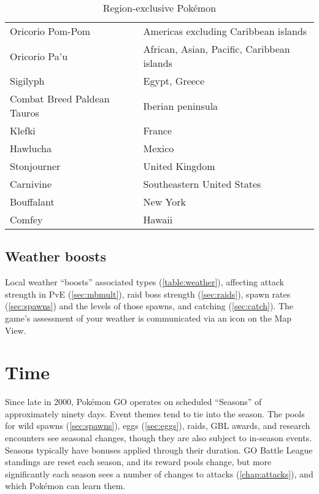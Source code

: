 \begin{table}
\begin{tabular}{p{}l}
Oricorio Pom-Pom & Americas excluding Caribbean islands\\
Oricorio Pa'u & African, Asian, Pacific, Caribbean islands\\
Sigilyph & Egypt, Greece\\
Combat Breed Paldean Tauros & Iberian peninsula\\
Klefki & France\\
Hawlucha & Mexico\\
Stonjourner & United Kingdom\\
Carnivine & Southeastern United States\\
Bouffalant & New York\\
Comfey & Hawaii\\
\end{tabular}
\caption{Region-exclusive Pokémon\label{table:regional}}
\end{table}
\subsection{Weather boosts\label{sec:weather}}
Local weather ``boosts'' associated types (\autoref{table:weather}),
  affecting attack strength in PvE (\autoref{sec:mbmult}),
  raid boss strength (\autoref{sec:raids}),
  spawn rates (\autoref{sec:spawns}) and the levels of those spawns,
  and catching (\autoref{sec:catch}).
The game's assessment of your weather is communicated via an icon on the Map View.
\begin{table}

\end{table}
\section{Time\label{sec:timeline}}
Since late in 2000, Pokémon GO operates on scheduled ``Seasons'' of approximately ninety days.
Event themes tend to tie into the season.
The pools for wild spawns (\autoref{sec:spawns}), eggs (\autoref{sec:eggs}), raids, GBL awards,
 and research encounters see seasonal changes, though they are also subject to in-season events.
Seasons typically have bonuses applied through their duration.
GO Battle League standings are reset each season, and its reward pools change, but
 more significantly each season sees a number of changes to attacks (\autoref{chap:attacks}),
 and which Pokémon can learn them.

